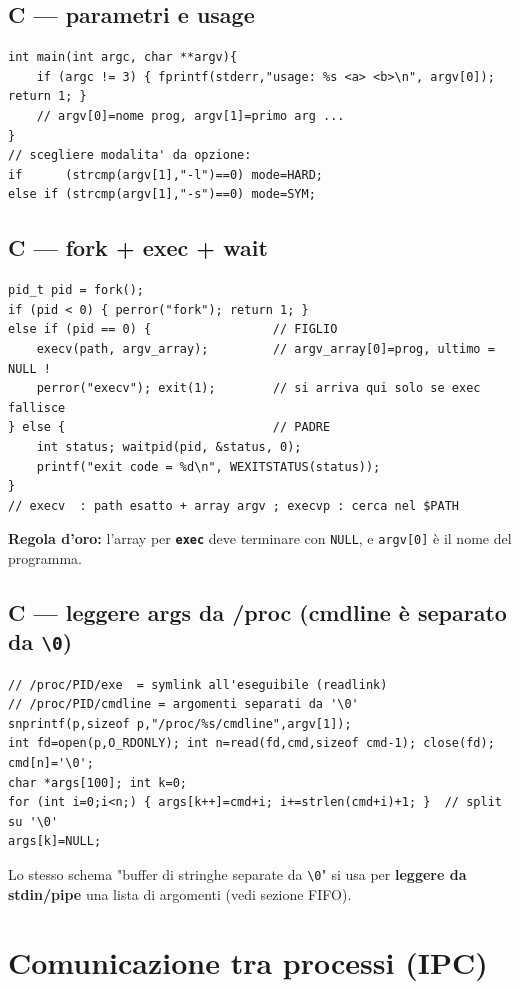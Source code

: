 \documentclass[10pt,a4paper]{article}
\newcommand{\fn}[1]{\texttt{\textbf{#1}}}
\begin{document}
\subsection{C --- parametri e usage}
\begin{lstlisting}[style=c]
int main(int argc, char **argv){
    if (argc != 3) { fprintf(stderr,"usage: %s <a> <b>\n", argv[0]); return 1; }
    // argv[0]=nome prog, argv[1]=primo arg ...
}
// scegliere modalita' da opzione:
if      (strcmp(argv[1],"-l")==0) mode=HARD;
else if (strcmp(argv[1],"-s")==0) mode=SYM;
\end{lstlisting}

\subsection{C --- fork + exec + wait}
\begin{lstlisting}[style=c]
pid_t pid = fork();
if (pid < 0) { perror("fork"); return 1; }
else if (pid == 0) {                 // FIGLIO
    execv(path, argv_array);         // argv_array[0]=prog, ultimo = NULL !
    perror("execv"); exit(1);        // si arriva qui solo se exec fallisce
} else {                             // PADRE
    int status; waitpid(pid, &status, 0);
    printf("exit code = %d\n", WEXITSTATUS(status));
}
// execv  : path esatto + array argv ; execvp : cerca nel $PATH
\end{lstlisting}
\textbf{Regola d'oro:} l'array per \fn{exec} deve terminare con \verb|NULL|, e \verb|argv[0]| è il nome del programma.

\subsection{C --- leggere args da /proc (cmdline è separato da \texttt{\textbackslash 0})}
\begin{lstlisting}[style=c]
// /proc/PID/exe  = symlink all'eseguibile (readlink)
// /proc/PID/cmdline = argomenti separati da '\0'
snprintf(p,sizeof p,"/proc/%s/cmdline",argv[1]);
int fd=open(p,O_RDONLY); int n=read(fd,cmd,sizeof cmd-1); close(fd); cmd[n]='\0';
char *args[100]; int k=0;
for (int i=0;i<n;) { args[k++]=cmd+i; i+=strlen(cmd+i)+1; }  // split su '\0'
args[k]=NULL;
\end{lstlisting}
Lo stesso schema "buffer di stringhe separate da \verb|\0|" si usa per \textbf{leggere da stdin/pipe} una lista di argomenti (vedi sezione FIFO).

\section{Comunicazione tra processi (IPC)}
\end{document}
